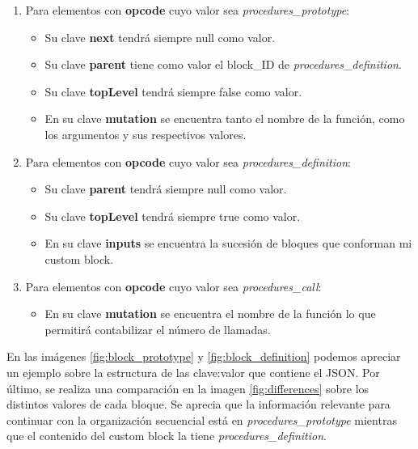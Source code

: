 \documentclass[a4paper, 12pt]{book}
\begin{document}
\begin{enumerate}
\item Para elementos con \textbf{opcode} cuyo valor sea \textit{procedures\_prototype}:
\begin{itemize}
\item Su clave \textbf{next} tendrá siempre null como valor.
\item Su clave \textbf{parent} tiene como valor el block\_ID de \textit{procedures\_definition}.
\item Su clave \textbf{topLevel} tendrá siempre false como valor.
\item En su clave \textbf{mutation} se encuentra tanto el nombre de la función, como los argumentos y sus respectivos valores.
\end{itemize}

\item Para elementos con \textbf{opcode} cuyo valor sea \textit{procedures\_definition}:
\begin{itemize}
\item Su clave \textbf{parent} tendrá siempre null como valor.
\item Su clave \textbf{topLevel} tendrá siempre true como valor.
\item En su clave \textbf{inputs} se encuentra la sucesión de bloques que conforman mi custom block.
\end{itemize}

\item Para elementos con \textbf{opcode} cuyo valor sea \textit{procedures\_call}:
\begin{itemize}
\item En su clave \textbf{mutation} se encuentra el nombre de la función lo que permitirá contabilizar el número de llamadas.
\end{itemize}
\end{enumerate}

En las imágenes \ref{fig:block_prototype} y \ref{fig:block_definition} podemos apreciar un ejemplo sobre la estructura de las clave:valor que contiene el JSON. Por último, se realiza una comparación en la imagen \ref{fig:differences} sobre los distintos valores de cada bloque. Se aprecia que la información relevante para continuar con la organización secuencial está en \textit{procedures\_prototype} mientras que el contenido del custom block la tiene \textit{procedures\_definition}.
\end{document}
